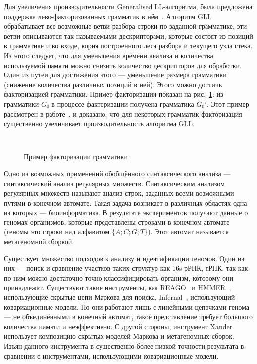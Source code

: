 Для увеличения производительности Generalised LL-алгоритма, была предложена поддержка 
лево-факторизованных грамматик в нём~\cite{scott2016structuring}.
Алгоритм GLL обрабатывает все возможные ветви разбора строки по заданной грамматике, 
эти ветви описываются так называемыми дескрипторами, которые состоят из позиций в грамматике и во входе,
корня построенного леса разбора и текущего узла стека. Из этого следует, что для уменьшения времени анализа и количества используемой памяти
можно снизить количество дескрипторов для обработки. Один из путей для достижения этого --- 
уменьшение размера грамматики (снижение количества различных позиций в ней).
Этого можно достичь факторизацией грамматики. Пример факторизации показан на рис.~\ref{fig:ExampleOfFactorization}:
из грамматики $G_0$ в процессе факторизации получена грамматика $G_0'$.
Этот пример рассмотрен в работе~\cite{scott2016structuring}, и доказано, что для некоторых грамматик факторизация 
существенно увеличивает производительность алгоритма GLL.
\begin{figure}
	\centering
	~
	\caption{Пример факторизации грамматики}
	\label{fig:ExampleOfFactorization}
\end{figure}

Одно из возможных применений обобщённого синтаксического анализа --- синтаксический анализ регулярных множеств.
Синтаксическим анализом регулярных множеств называют анализ строк, заданных всеми возможными путями в конечном автомате.
Такая задача возникает в различных областях одна из которых --- биоинформатика. В результате экспериментов 
получают данные о геномах организмов, которые представлены строками в конечном автомате (геномы это строки над алфавитом $\{A;C; G; T\}$).
Этот автомат называется метагеномной сборкой.

Существует множество подходов к анализу и идентификации геномов. Один из них --- поиск и сравнение участков таких структур как
16s рРНК, тРНК, так как по ним можно достаточно точно классифицировать организм, которому они принадлежат.
Существуют такие инструменты, как REAGO~\cite{reago} и HMMER~\cite{hmmer}, использующие скрытые цепи Маркова для поиска, 
Infernal~\cite{Infernal}, использующий ковариационные модели. Но они работают лишь с линейными цепочками генома ---
не объединёнными в конечный автомат, такое представление требует большого количества памяти и неэффективно.
С другой стороны, инструмент Xander~\cite{xander} использует композицию скрытых моделей Маркова и метагеномных сборок.
Изъян данного инструмента в существенно более низкой точности результата в сравнении с инструментами, использующими ковариационные модели.

